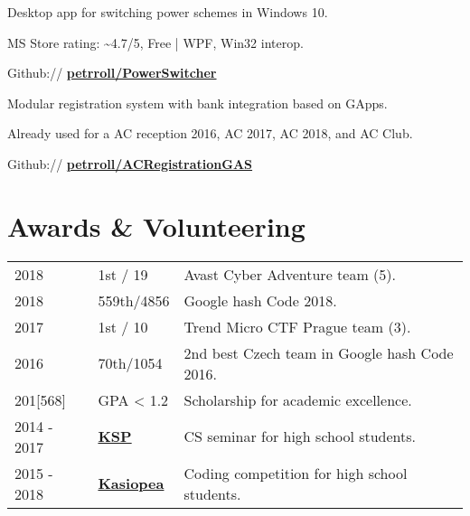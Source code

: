 \documentclass[a4paper]{deedy-resume} %
\begin{document}
\begin{minipage}[t]{0.62\textwidth}
\sectionspace %



\emptyLocation %
\begin{tightitemize}
\item Desktop app for switching power schemes in Windows 10.
\item MS Store rating: \textasciitilde4.7/5, Free | WPF, Win32 interop.
\item Github:// \href{https://github.com/petrroll/PowerSwitcher}{\bf petrroll/PowerSwitcher}
\end{tightitemize}

\sectionspace %


\emptyLocation %
\begin{tightitemize}
\item Modular registration system with bank integration based on GApps.
\item Already used for a AC reception 2016, AC 2017, AC 2018, and AC Club.
\item Github:// \href{https://github.com/petrroll/ACRegistrationGAS}{\bf petrroll/ACRegistrationGAS}
\end{tightitemize}

\sectionspace %


\section{Awards \& Volunteering} 

\begin{tabular}{lll}
2018 & 1st / 19 & Avast Cyber Adventure team (5). \\
2018 & 559th/4856 & Google hash Code 2018. \\
2017 & 1st / 10 & Trend Micro CTF Prague team (3). \\
2016 & 70th/1054 & 2nd best Czech team in Google hash Code 2016. \\
201[568] & GPA < 1.2 & Scholarship for academic excellence. \\
2014 - 2017 & \href{https://ksp.mff.cuni.cz/}{\bf KSP} & CS seminar for high school students. \\
2015 - 2018 & \href{https://kasiopea.matfyz.cz/}{\bf Kasiopea} & Coding competition for high school students. \\
\end{tabular}


\end{minipage}
\end{document}
